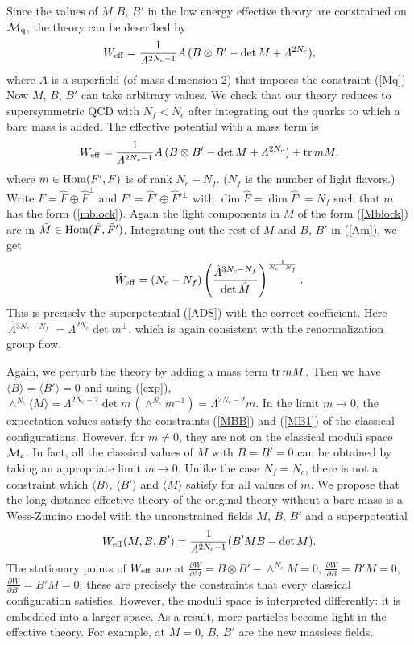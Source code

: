 \documentclass[lecture]{qft-l}
\newcommand{\Lam}{\varLambda}
\newcommand{\bra}{\langle}
\newcommand{\ket}{\rangle}
\newcommand{\inv}[1]{\frac{1}{#1}}
\newcommand{\pdr}{\partial}
\newcommand{\tr}{{\rm tr}}
\newcommand{\MM}{{\mathcal M}}
\newcommand{\MC}{\MM_{{\rm c}}}
\newcommand{\MQ}{\MM_{{\rm q}}}
\newcommand{\eff}{_{{\rm eff}}}
\newcommand{\Hom}{{\rm Hom}}
\newcommand{\FT}{F'}%
\newcommand{\BT}{B'}%
\newcommand{\FTh}{\hat{F}'}
\newcommand{\Lamh}{\,\hat{\!\Lam}{}}
\numberwithin{figure}{chapter}
\begin{document}
Since the values of $M$ $B$, $\BT$ in the low energy effective theory are 
constrained on $\MQ$, the theory can be described by
	\begin{equation}\label{A}
W\eff=\inv{\Lam^{2N_c-1}}A\,(B\otimes\BT-\det M+\Lam^{2N_c}),
	\end{equation}
where $A$ is a superfield (of mass dimension $2$) that imposes the constraint
(\ref{Mq}) 
Now $M$, $B$, $\BT$ can take arbitrary values.
We check that our theory reduces to supersymmetric QCD with $N_f<N_c$ 
after integrating out the quarks to which a bare mass is added.
The effective potential with a mass term is
	\begin{equation}\label{Am}
W\eff=\inv{\Lam^{2N_c-1}}A\,(B\otimes\BT-\det M+\Lam^{2N_c})+\tr\,mM,	
	\end{equation}
where $m\in\Hom(\FT,F)$ is of rank $N_c-N_f$.
($N_f$ is the number of light flavors.)
Write $F=\hat{F}\oplus\hat{F}^\perp$ and $\FT=\FTh\oplus
\FTh{^{\perp}}$
with $\dim\hat{F}=\dim\FTh=N_f$ such that $m$ has the form (\ref{mblock}).
Again the light components in $M$ of the form (\ref{Mblock}) are in
$\hat{M}\in\Hom(\hat{F},\FTh)$.
Integrating out the rest of $M$ and $B$, $\BT$ in (\ref{Am}), we get
	\begin{equation}
\hat{W}\eff=(N_c-N_f)
\left(\frac{\Lamh^{3N_c-N_f}}{\det\hat{M}}\right)^{\inv{N_c-N_f}}.
	\end{equation}
This is precisely the superpotential (\ref{ADS}) 
with the correct coefficient.
Here $\Lamh^{3N_c-N_f}$\break
$=\Lam^{2N_c}\det m^\perp$,
which is again consistent with the renormalization group flow.


Again, we perturb the theory by adding a mass term $\tr\,mM$.
Then we have $\bra B\ket=\bra\BT\ket=0$ and using (\ref{exp}),
$\wedge^{N_c}\bra M\ket=\Lam^{2N_c-2}\det m\,(\wedge^{N_c}m^{-1})
=\Lam^{2N_c-2}m$.
In the limit $m\to0$, the expectation values satisfy the constraints 
(\ref{MBB}) and (\ref{MB1}) of the classical configurations.
However, for $m\ne0$, they are not on the classical moduli space $\MC$.
In fact, all the classical values of $M$ with $B=\BT=0$ can be obtained
by taking an appropriate limit $m\to0$.
Unlike the case $N_f=N_c$, there is not a constraint which $\bra B\ket$,
$\bra\BT\ket$ and $\bra M\ket$ satisfy for all values of $m$. 
We propose that the long distance effective theory of the original theory
without a bare mass is a Wess-Zumino model with the unconstrained fields
$M$, $B$, $\BT$ and a superpotential
	\begin{equation}\label{W+2}
W\eff(M,B,\BT)=\inv{\Lam^{2N_c-1}}(\BT MB-\det M).	
	\end{equation}
The stationary points of $W\eff$ are at
$\frac{\pdr W}{\pdr M}=B\otimes\BT-\wedge^{N_c}M=0$,
$\frac{\pdr W}{\pdr B}=\BT M=0$, $\frac{\pdr W}{\pdr\BT}=\BT M=0$;
these are precisely the constraints that every classical configuration
satisfies.
However, the moduli space is interpreted differently:
it is embedded into a larger space.
As a result, more particles become light in the effective theory.
For example, at $M=0$, $B$, $\BT$ are the new massless fields.
\end{document}
